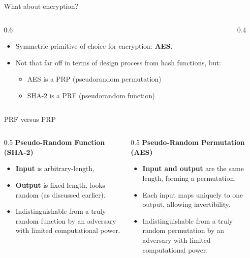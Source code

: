 \documentclass[aspectratio=169, lualatex, handout]{beamer}
\begin{document}
\begin{frame}{What about encryption?}
	\begin{columns}[c]
		\begin{column}{0.6\textwidth}
			\begin{itemize}[<+->]
				\item Symmetric primitive of choice for encryption: \textbf{AES}.
				\item Not that far off in terms of design process from hash functions,
				      but:
				      \begin{itemize}[<+->]
					      \item AES is a PRP (pseudorandom permutation)
					      \item SHA-2 is a PRF (pseudorandom function)
				      \end{itemize}
			\end{itemize}
		\end{column}

		\begin{column}{0.4\textwidth}
		\end{column}
	\end{columns}
\end{frame}

\begin{frame}{PRF versus PRP}
	\begin{columns}[c]
		\begin{column}{0.5\textwidth}
			\textbf{Pseudo-Random Function (SHA-2)}
			\begin{itemize}[<+->]
				\item \textbf{Input} is arbitrary-length,
				\item \textbf{Output} is fixed-length, looks random (as discussed
				      earlier).
				\item Indistinguishable from a truly random function by an adversary with
				      limited computational power.
			\end{itemize}
		\end{column}

		\begin{column}{0.5\textwidth}
			\textbf{Pseudo-Random Permutation (AES)}
			\begin{itemize}[<+->]
				\item \textbf{Input and output} are the same length, forming a permutation.
				\item Each input maps uniquely to one output, allowing invertibility.
				\item Indistinguishable from a truly random permutation by an adversary
				      with limited computational power.
			\end{itemize}
		\end{column}
	\end{columns}
\end{frame}
\end{document}
